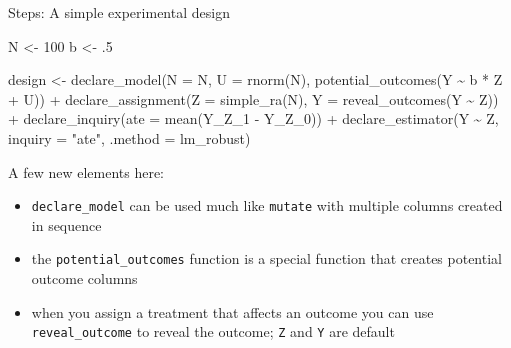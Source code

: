 \documentclass[
  11pt,
  ignorenonframetext,
]{beamer}
\newenvironment{Shaded}{\begin{snugshade}}{\end{snugshade}}
\newcommand{\AttributeTok}[1]{\textcolor[rgb]{0.40,0.45,0.13}{#1}}
\newcommand{\DecValTok}[1]{\textcolor[rgb]{0.68,0.00,0.00}{#1}}
\newcommand{\FunctionTok}[1]{\textcolor[rgb]{0.28,0.35,0.67}{#1}}
\newcommand{\NormalTok}[1]{\textcolor[rgb]{0.00,0.23,0.31}{#1}}
\newcommand{\OtherTok}[1]{\textcolor[rgb]{0.00,0.23,0.31}{#1}}
\newcommand{\SpecialCharTok}[1]{\textcolor[rgb]{0.37,0.37,0.37}{#1}}
\newcommand{\StringTok}[1]{\textcolor[rgb]{0.13,0.47,0.30}{#1}}
\providecommand{\tightlist}{%
  \setlength{\itemsep}{0pt}\setlength{\parskip}{0pt}}\usepackage{longtable,booktabs,array}
\begin{document}
\begin{frame}[fragile]{Steps: A simple experimental design}
\protect\hypertarget{steps-a-simple-experimental-design}{}
\begin{Shaded}
\begin{Highlighting}[]
\NormalTok{N }\OtherTok{\textless{}{-}} \DecValTok{100}
\NormalTok{b }\OtherTok{\textless{}{-}}\NormalTok{ .}\DecValTok{5}

\NormalTok{design }\OtherTok{\textless{}{-}} 
  \FunctionTok{declare\_model}\NormalTok{(}\AttributeTok{N =}\NormalTok{ N, }\AttributeTok{U =} \FunctionTok{rnorm}\NormalTok{(N), }
                \FunctionTok{potential\_outcomes}\NormalTok{(Y }\SpecialCharTok{\textasciitilde{}}\NormalTok{ b }\SpecialCharTok{*}\NormalTok{ Z }\SpecialCharTok{+}\NormalTok{ U)) }\SpecialCharTok{+} 
  \FunctionTok{declare\_assignment}\NormalTok{(}\AttributeTok{Z =} \FunctionTok{simple\_ra}\NormalTok{(N), }\AttributeTok{Y =} \FunctionTok{reveal\_outcomes}\NormalTok{(Y }\SpecialCharTok{\textasciitilde{}}\NormalTok{ Z)) }\SpecialCharTok{+} 
  \FunctionTok{declare\_inquiry}\NormalTok{(}\AttributeTok{ate =} \FunctionTok{mean}\NormalTok{(Y\_Z\_1 }\SpecialCharTok{{-}}\NormalTok{ Y\_Z\_0)) }\SpecialCharTok{+} 
  \FunctionTok{declare\_estimator}\NormalTok{(Y }\SpecialCharTok{\textasciitilde{}}\NormalTok{ Z, }\AttributeTok{inquiry =} \StringTok{"ate"}\NormalTok{, }\AttributeTok{.method =}\NormalTok{ lm\_robust)}
\end{Highlighting}
\end{Shaded}

A few new elements here:

\begin{itemize}
\tightlist
\item
  \texttt{declare\_model} can be used much like \texttt{mutate} with
  multiple columns created in sequence
\item
  the \texttt{potential\_outcomes} function is a special function that
  creates potential outcome columns
\item
  when you assign a treatment that affects an outcome you can use
  \texttt{reveal\_outcome} to reveal the outcome; \texttt{Z} and
  \texttt{Y} are default
\end{itemize}
\end{frame}
\end{document}
